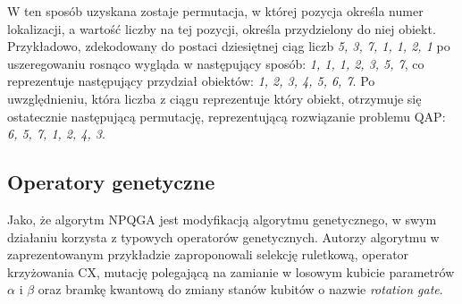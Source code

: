 W ten sposób uzyskana zostaje permutacja, w której pozycja określa numer lokalizacji, a wartość liczby na tej pozycji, określa przydzielony do niej obiekt. Przykładowo, zdekodowany do postaci dziesiętnej ciąg liczb \textit{5, 3, 7, 1, 1, 2, 1} po uszeregowaniu rosnąco wygląda w następujący sposób: \textit{1, 1, 1, 2, 3, 5, 7}, co reprezentuje następujący przydział obiektów: \textit{1, 2, 3, 4, 5, 6, 7}. Po uwzględnieniu, która liczba z ciągu reprezentuje który obiekt, otrzymuje się ostatecznie następującą permutację, reprezentującą rozwiązanie problemu QAP: \textit{6, 5, 7, 1, 2, 4, 3}.

\subsection{Operatory genetyczne}
Jako, że algorytm NPQGA jest modyfikacją algorytmu genetycznego, w swym działaniu korzysta z typowych operatorów genetycznych. Autorzy algorytmu w zaprezentowanym przykładzie zaproponowali selekcję ruletkową, operator krzyżowania CX, mutację polegającą na zamianie w losowym kubicie parametrów $\alpha$ i $\beta$ oraz bramkę kwantową do zmiany stanów kubitów o nazwie \textit{rotation gate}.

